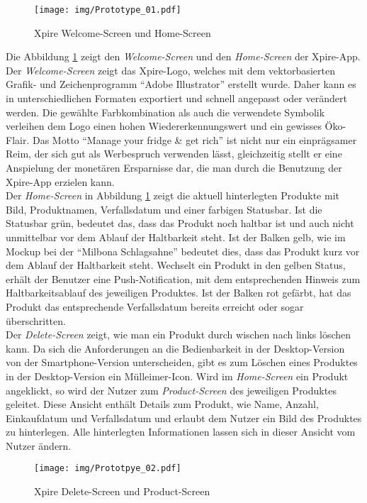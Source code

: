 \begin{figure}[hbt!]
	\centering
	\texttt{[image: img/Prototype\_01.pdf]}
	\caption{Xpire Welcome-Screen und Home-Screen}
	\label{fig:prot1}
\end{figure}
Die Abbildung \ref{fig:prot1} zeigt den \textit{Welcome-Screen} und den \textit{Home-Screen} der Xpire-App. Der \textit{Welcome-Screen} zeigt das Xpire-Logo, welches mit dem vektorbasierten Grafik- und Zeichenprogramm \enquote{Adobe Illustrator} erstellt wurde. Daher kann es in unterschiedlichen Formaten exportiert und schnell angepasst oder verändert werden. Die gewählte Farbkombination als auch die verwendete Symbolik verleihen dem Logo einen hohen Wiedererkennungswert und ein gewisses Öko-Flair. Das Motto \enquote{Manage your fridge \& get rich} ist nicht nur ein einprägsamer Reim, der sich gut als Werbespruch verwenden lässt, gleichzeitig stellt er eine Anspielung der monetären Ersparnisse dar, die man durch die Benutzung der Xpire-App erzielen kann.\\
Der \textit{Home-Screen} in Abbildung \ref{fig:prot1} zeigt die aktuell hinterlegten Produkte mit Bild, Produktnamen, Verfallsdatum und einer farbigen Statusbar. Ist die Statusbar grün, bedeutet das, dass das Produkt noch haltbar ist und auch nicht unmittelbar vor dem Ablauf der Haltbarkeit steht. Ist der Balken gelb, wie im Mockup bei der \enquote{Milbona Schlagsahne} bedeutet dies, dass das Produkt kurz vor dem Ablauf der Haltbarkeit steht. Wechselt ein Produkt in den gelben Status, erhält der Benutzer eine Push-Notification, mit dem entsprechenden Hinweis zum Haltbarkeitsablauf des jeweiligen Produktes. Ist der Balken rot gefärbt, hat das Produkt das entsprechende Verfallsdatum bereits erreicht oder sogar überschritten.\\
Der \textit{Delete-Screen} zeigt, wie man ein Produkt durch wischen nach links löschen kann. Da sich die Anforderungen an die Bedienbarkeit in der Desktop-Version von der Smartphone-Version unterscheiden, gibt es zum Löschen eines Produktes in der Desktop-Version ein Mülleimer-Icon.
Wird im \textit{Home-Screen} ein Produkt angeklickt, so wird der Nutzer zum \textit{Product-Screen} des jeweiligen Produktes geleitet. Diese Ansicht enthält Details zum Produkt, wie Name, Anzahl, Einkaufdatum und Verfallsdatum und erlaubt dem Nutzer ein Bild des Produktes zu hinterlegen. Alle hinterlegten Informationen lassen sich in dieser Ansicht vom Nutzer ändern.


\begin{figure} 
	\centering
	\texttt{[image: img/Prototpye\_02.pdf]}
	\caption{Xpire Delete-Screen und Product-Screen}
	\label{fig:prot2}
\end{figure}
